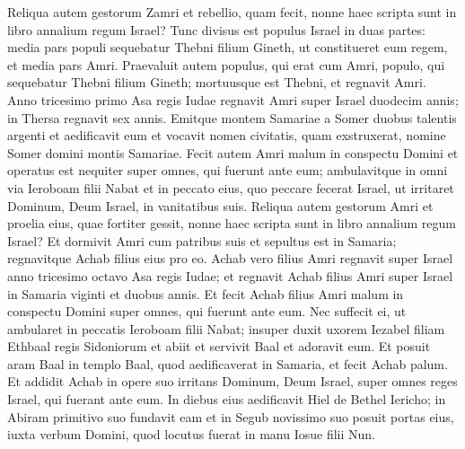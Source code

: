 \begin{biblechapter}
\begin{biblechapter}
\begin{biblechapter}
\begin{biblechapter}
\begin{biblechapter}
\begin{biblechapter}
\begin{biblechapter}
\begin{biblechapter}
\begin{biblechapter}
\begin{biblechapter}
\begin{biblechapter}
\begin{biblechapter}
\begin{biblechapter}
\begin{biblechapter}
\begin{biblechapter}
\begin{biblechapter}
 \verse Reliqua autem gestorum Zamri et rebellio, quam fecit, nonne haec scripta sunt in libro annalium regum Israel?
 \verse Tunc divisus est populus Israel in duas partes: media pars populi sequebatur Thebni filium Gineth, ut constitueret eum regem, et media pars Amri. 
\verse Praevaluit autem populus, qui erat cum Amri, populo, qui sequebatur Thebni filium Gineth; mortuusque est Thebni, et regnavit Amri.
 \verse Anno tricesimo primo Asa regis Iudae regnavit Amri super Israel duodecim annis; in Thersa regnavit sex annis. 
\verse Emitque montem Samariae a Somer duobus talentis argenti et aedificavit eum et vocavit nomen civitatis, quam exstruxerat, nomine Somer domini montis Samariae. 
\verse Fecit autem Amri malum in conspectu Domini et operatus est nequiter super omnes, qui fuerunt ante eum; 
 \verse ambulavitque in omni via Ieroboam filii Nabat et in peccato eius, quo peccare fecerat Israel, ut irritaret Dominum, Deum Israel, in vanitatibus suis.
 \verse Reliqua autem gestorum Amri et proelia eius, quae fortiter gessit, nonne haec scripta sunt in libro annalium regum Israel? 
\verse Et dormivit Amri cum patribus suis et sepultus est in Samaria; regnavitque Achab filius eius pro eo.
 \verse Achab vero filius Amri regnavit super Israel anno tricesimo octavo Asa regis Iudae; et regnavit Achab filius Amri super Israel in Samaria viginti et duobus annis. 
\verse Et fecit Achab filius Amri malum in conspectu Domini super omnes, qui fuerunt ante eum. 
\verse Nec suffecit ei, ut ambularet in peccatis Ieroboam filii Nabat; insuper duxit uxorem Iezabel filiam Ethbaal regis Sidoniorum et abiit et servivit Baal et adoravit eum. 
\verse Et posuit aram Baal in templo Baal, quod aedificaverat in Samaria, 
\verse et fecit Achab palum. Et addidit Achab in opere suo irritans Dominum, Deum Israel, super omnes reges Israel, qui fuerant ante eum. 
\verse In diebus eius aedificavit Hiel de Bethel Iericho; in Abiram primitivo suo fundavit eam et in Segub novissimo suo posuit portas eius, iuxta verbum Domini, quod locutus fuerat in manu Iosue filii Nun.
 

\end{biblechapter}
\end{biblechapter}
\end{biblechapter}
\end{biblechapter}
\end{biblechapter}
\end{biblechapter}
\end{biblechapter}
\end{biblechapter}
\end{biblechapter}
\end{biblechapter}
\end{biblechapter}
\end{biblechapter}
\end{biblechapter}
\end{biblechapter}
\end{biblechapter}
\end{biblechapter}
